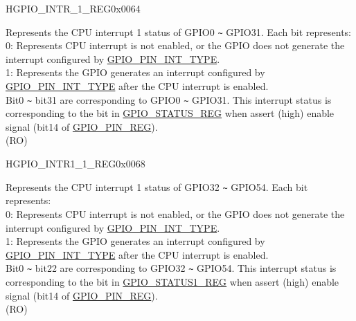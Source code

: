 \begin{register}{H}{GPIO\_INTR\_1\_REG}{0x0064}\label{regdesc:GPIOINTR1REG}
%
\regnewline%
\begin{regdesc}\begin{reglist}
\label{fielddesc:GPIOINT1}\item [GPIO\_INT\_1] Represents the CPU interrupt 1 status of GPIO0 \verb+~+ GPIO31. Each bit represents:\\
0: Represents CPU interrupt is not enabled, or the GPIO does not generate the interrupt configured by \hyperref[fielddesc:GPIOPINNINTTYPE]{GPIO\_PIN\_INT\_TYPE}.\\
1: Represents the GPIO generates an interrupt configured by \hyperref[fielddesc:GPIOPINNINTTYPE]{GPIO\_PIN\_INT\_TYPE} after the CPU interrupt is enabled.\\
Bit0 \verb+~+ bit31 are corresponding to GPIO0 \verb+~+ GPIO31. This interrupt status is corresponding to the bit in \hyperref[regdesc:GPIOSTATUSREG]{GPIO\_STATUS\_REG} when assert (high) enable signal (bit14 of \hyperref[regdesc:GPIOPINNREG]{GPIO\_PIN\_REG}). \\
(RO)
\end{reglist}\end{regdesc}
\end{register}


\begin{register}{H}{GPIO\_INTR1\_1\_REG}{0x0068}\label{regdesc:GPIOINTR11REG}
%
%
\regnewline%
\begin{regdesc}\begin{reglist}
\label{fielddesc:GPIOINT11}\item [GPIO\_INT1\_1] Represents the CPU interrupt 1 status of GPIO32 \verb+~+ GPIO54. Each bit represents:\\
0: Represents CPU interrupt is not enabled, or the GPIO does not generate the interrupt configured by \hyperref[fielddesc:GPIOPINNINTTYPE]{GPIO\_PIN\_INT\_TYPE}.\\
1: Represents the GPIO generates an interrupt configured by \hyperref[fielddesc:GPIOPINNINTTYPE]{GPIO\_PIN\_INT\_TYPE} after the CPU interrupt is enabled.\\
Bit0 \verb+~+ bit22 are corresponding to GPIO32 \verb+~+ GPIO54. This interrupt status is corresponding to the bit in \hyperref[regdesc:GPIOSTATUS1REG]{GPIO\_STATUS1\_REG} when assert (high) enable signal (bit14 of \hyperref[regdesc:GPIOPINNREG]{GPIO\_PIN\_REG}). \\
(RO)
\end{reglist}\end{regdesc}
\end{register}


